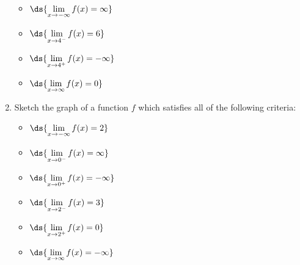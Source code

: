 \documentclass{ximera}
\begin{document}
\begin{enumerate}
\begin{multicols}{4}
\begin{itemize}

\item $\ds{\lim_{x \rightarrow -\infty}  f(x) = \infty}$

\item $\ds{\lim_{x \rightarrow 4^{-}} f(x) = 6}$

\item $\ds{\lim_{x \rightarrow 4^{+}} f(x) = - \infty}$

\item $\ds{\lim_{x \rightarrow \infty}  f(x) =0}$

\end{itemize}

\end{multicols}

\item Sketch the graph of a function $f$  which satisfies all of the following criteria:

\bigskip

\begin{multicols}{3}

\begin{itemize}

\item $\ds{\lim_{x \rightarrow -\infty} f(x) = 2}$

\item $\ds{\lim_{x \rightarrow 0^{-}} f(x) = \infty}$

\item $\ds{\lim_{x \rightarrow 0^{+}} f(x) = -\infty}$

\end{itemize}

\end{multicols}

\bigskip

\begin{multicols}{3}

\begin{itemize}

\item $\ds{\lim_{x \rightarrow 2^{-}} f(x) = 3}$

\item $\ds{\lim_{x \rightarrow 2^{+}} f(x) =0}$

\item $\ds{\lim_{x \rightarrow \infty} f(x) = -\infty}$

\end{itemize}

\end{multicols}



\end{enumerate}
\end{document}
